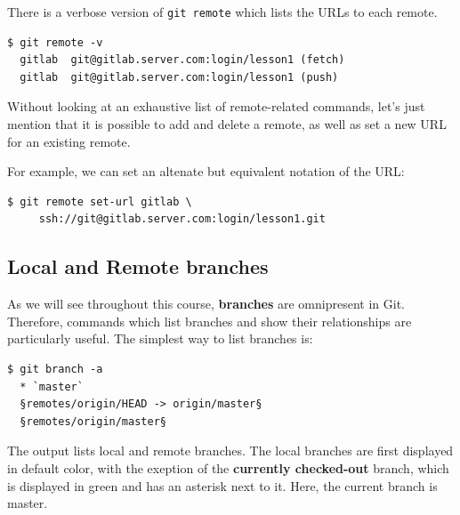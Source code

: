 \documentclass[a4paper]{../../common/tufte-latex/tufte-handout}
\begin{document}
There is a verbose version of \texttt{git remote} which lists the URLs to each remote.

\begin{lstlisting}[style=BashInputStyle]
  $ git remote -v
  gitlab  git@gitlab.server.com:login/lesson1 (fetch)
  gitlab  git@gitlab.server.com:login/lesson1 (push)
\end{lstlisting}

Without looking at an exhaustive list of remote-related commands, let's just mention that it is possible to add and delete a remote, as well as set a new URL for an existing remote.

For example, we can set an altenate but equivalent notation of the URL:


\begin{lstlisting}[style=BashInputStyle]
  $ git remote set-url gitlab \
     ssh://git@gitlab.server.com:login/lesson1.git
\end{lstlisting}

\subsection{Local and Remote branches}

As we will see throughout this course, \textbf{branches} are omnipresent in Git.
Therefore, commands which list branches and show their relationships are particularly useful.
The simplest way to list branches is:


\begin{lstlisting}[style=BashInputStyle]
  $ git branch -a
  * `master`
  §remotes/origin/HEAD -> origin/master§
  §remotes/origin/master§
\end{lstlisting}

The output lists local and remote branches.
The local branches are first displayed in default color, with the exeption of the \textbf{currently checked-out} branch, which is displayed in green and has an asterisk next to it.
Here, the current branch is master.
\end{document}
